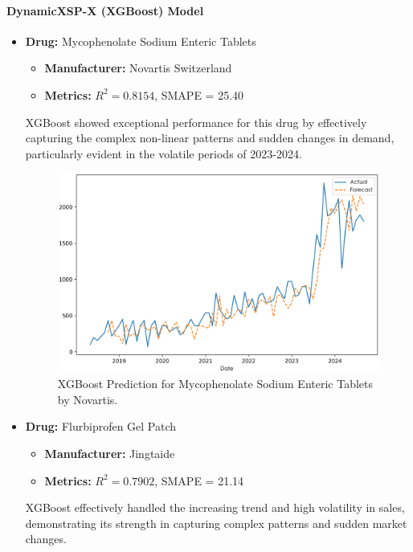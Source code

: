 \documentclass[journal]{IEEEtran}
\begin{document}
\paragraph{DynamicXSP-X (XGBoost) Model} %
\begin{itemize}
\item \textbf{Drug:} Mycophenolate Sodium Enteric Tablets
\begin{itemize}
\item \textbf{Manufacturer:} Novartis Switzerland
\item \textbf{Metrics:} $R^2 = 0.8154$, SMAPE = 25.40
\end{itemize}
XGBoost showed exceptional performance for this drug by effectively capturing the complex non-linear patterns and sudden changes in demand, particularly evident in the volatile periods of 2023-2024.
\begin{figure}[H]
\centering
\includegraphics[width=\linewidth]{../Result_Paper/XGBoost_Prediction_麦考酚钠肠溶片_瑞士诺华.png}
\caption{XGBoost Prediction for Mycophenolate Sodium Enteric Tablets by Novartis.}
\label{fig:mycophenolate}
\end{figure}
\item \textbf{Drug:} Flurbiprofen Gel Patch
\begin{itemize}
\item \textbf{Manufacturer:} Jingtaide
\item \textbf{Metrics:} $R^2 = 0.7902$, SMAPE = 21.14
\end{itemize}
XGBoost effectively handled the increasing trend and high volatility in sales, demonstrating its strength in capturing complex patterns and sudden market changes.
\begin{figure}[H]
\centering

\end{figure}
\end{itemize}
\end{document}
